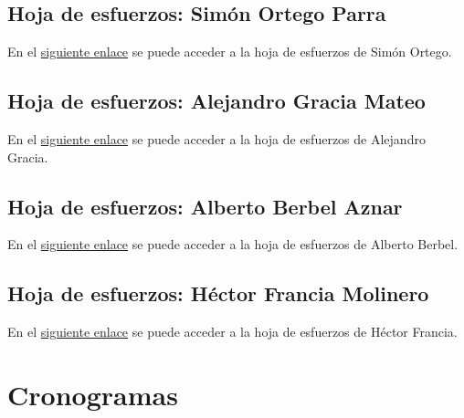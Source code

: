 \documentclass[10pt,spanish]{article}
\let\stdsection\section
\renewcommand\section{\newpage\stdsection}
\newcommand{\hojaesfuerzos}[2]{\href{run:recopilacion_esfuerzos/#1.xls}{#2}}
\begin{document}
\subsection{Hoja de esfuerzos: Simón Ortego Parra}
%
En el \hojaesfuerzos{simon_recopilacion_esfuerzos}{siguiente enlace} se puede acceder a la hoja de 
esfuerzos de Simón Ortego.

\subsection{Hoja de esfuerzos: Alejandro Gracia Mateo}
%
En el \hojaesfuerzos{alejandro_recopilacion_esfuerzos}{siguiente enlace} se puede acceder a la hoja de 
esfuerzos de Alejandro Gracia.

\subsection{Hoja de esfuerzos: Alberto Berbel Aznar}
%
En el \hojaesfuerzos{alberto_recopilacion_esfuerzos}{siguiente enlace} se puede acceder a la hoja de 
esfuerzos de Alberto Berbel.

\subsection{Hoja de esfuerzos: Héctor Francia Molinero}
%
En el \hojaesfuerzos{hector_recopilacion_esfuerzos}{siguiente enlace} se puede acceder a la hoja de 
esfuerzos de Héctor Francia.


\section{Cronogramas}\label{sec:cronogramas}


\end{document}
